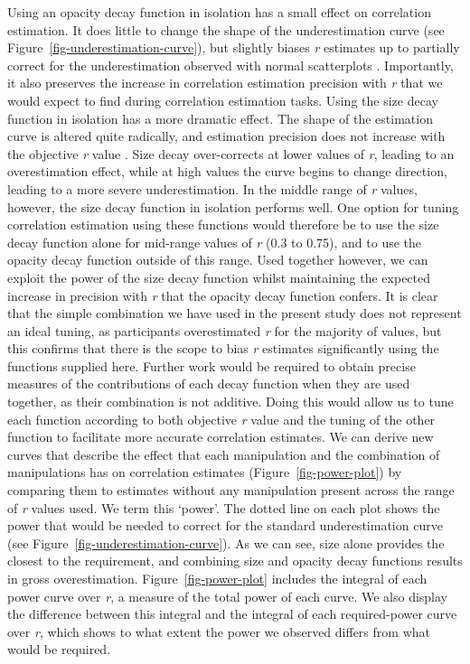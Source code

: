 \documentclass[sigconf]{acmart}
\begin{document}
Using an opacity decay function in isolation has a small effect on
correlation estimation. It does little to change the shape of the
underestimation curve (see Figure~\ref{fig-underestimation-curve}), but
slightly biases \emph{r} estimates up to partially correct for the
underestimation observed with normal scatterplots \citep{strain_2023}.
Importantly, it also preserves the increase in correlation estimation
precision with \emph{r} that we would expect to find during correlation
estimation tasks. Using the size decay function in isolation has a more
dramatic effect. The shape of the estimation curve is altered quite
radically, and estimation precision does not increase with the objective
\emph{r} value \citep{strain_2023b}. Size decay over-corrects at lower
values of \emph{r}, leading to an overestimation effect, while at high
values the curve begins to change direction, leading to a more severe
underestimation. In the middle range of \emph{r} values, however, the
size decay function in isolation performs well. One option for tuning
correlation estimation using these functions would therefore be to use
the size decay function alone for mid-range values of \emph{r} (0.3 to
0.75), and to use the opacity decay function outside of this range. Used
together however, we can exploit the power of the size decay function
whilst maintaining the expected increase in precision with \emph{r} that
the opacity decay function confers. It is clear that the simple
combination we have used in the present study does not represent an
ideal tuning, as participants overestimated \emph{r} for the majority of
values, but this confirms that there is the scope to bias \emph{r}
estimates significantly using the functions supplied here. Further work
would be required to obtain precise measures of the contributions of
each decay function when they are used together, as their combination is
not additive. Doing this would allow us to tune each function according
to both objective \emph{r} value and the tuning of the other function to
facilitate more accurate correlation estimates. We can derive new curves
that describe the effect that each manipulation and the combination of
manipulations has on correlation estimates (Figure~\ref{fig-power-plot})
by comparing them to estimates without any manipulation present across
the range of \emph{r} values used. We term this `power'. The dotted line
on each plot shows the power that would be needed to correct for the
standard underestimation curve (see
Figure~\ref{fig-underestimation-curve}). As we can see, size alone
provides the closest to the requirement, and combining size and opacity
decay functions results in gross overestimation.
Figure~\ref{fig-power-plot} includes the integral of each power curve
over \emph{r}, a measure of the total power of each curve. We also
display the difference between this integral and the integral of each
required-power curve over \emph{r}, which shows to what extent the power
we observed differs from what would be required.
\end{document}
